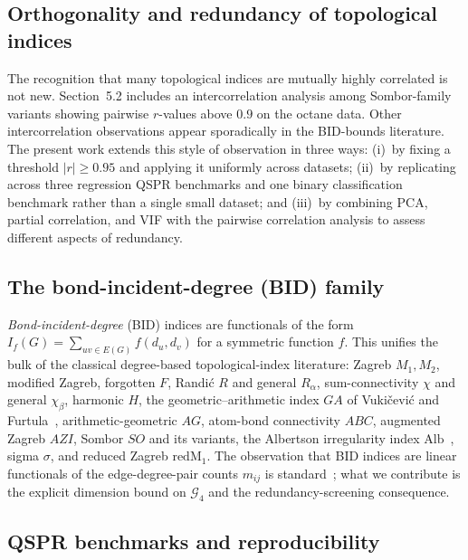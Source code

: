 \documentclass[STIX1COL]{WileyNJDv5}
\theoremstyle{definition}
\begin{document}
\subsection{Orthogonality and redundancy of topological indices}

The recognition that many topological indices are mutually highly
correlated is not new. \cite{MovahediGutmanRedzepovicFurtula2026}
Section~5.2 includes an intercorrelation analysis among
Sombor-family variants showing pairwise $r$-values above $0.9$ on
the octane data. Other intercorrelation observations appear
sporadically in the BID-bounds literature. The present work
extends this style of observation in three ways: (i)~by fixing a
threshold $|r|\ge 0.95$ and applying it uniformly across datasets;
(ii)~by replicating across three regression QSPR benchmarks and
one binary classification benchmark rather than a single small
dataset; and (iii)~by combining
PCA, partial correlation, and VIF with the pairwise correlation
analysis to assess different aspects of redundancy.

\subsection{The bond-incident-degree (BID) family}

\emph{Bond-incident-degree} (BID) indices are functionals of the
form $I_f(G)=\sum_{uv\in E(G)} f(d_u,d_v)$ for a symmetric
function $f$. This unifies the bulk of the classical degree-based
topological-index literature: Zagreb $M_1,M_2$, modified Zagreb,
forgotten $F$, Randi\'c $R$ and general $R_\alpha$,
sum-connectivity $\chi$ and general $\chi_\beta$, harmonic $H$,
the geometric--arithmetic index $GA$ of Vuki\v{c}evi\'c and
Furtula~\cite{VukicevicFurtula2009GA}, arithmetic-geometric $AG$,
atom-bond connectivity $ABC$, augmented Zagreb $AZI$, Sombor $SO$
and its variants, the Albertson irregularity index
$\mathrm{Alb}$~\cite{Albertson1997}, sigma $\sigma$, and reduced
Zagreb $\mathrm{redM}_1$. The observation that BID
indices are linear functionals of the edge-degree-pair counts
$m_{ij}$ is standard~\cite{BorovicaninDasFurtulaGutman2017Zagreb}; what we
contribute is the explicit dimension bound on $\mathcal{G}_4$ and
the redundancy-screening consequence.

\subsection{QSPR benchmarks and reproducibility}
\end{document}
